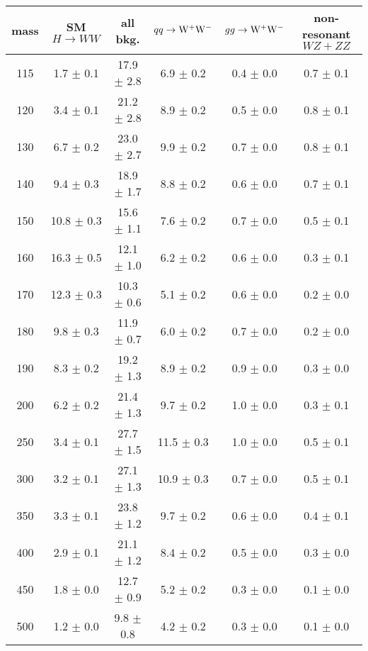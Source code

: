 \begin{table}[!ht]
  \begin{center}
 {\normalsize
  \begin{tabular} {|c|c|c|c|c|c|}
\hline
  mass    & SM $H\to WW$ & all bkg. & $qq \to \mathrm{W}^+\mathrm{W}^-$ & $gg \to \mathrm{W}^+\mathrm{W}^-$ & non-resonant $WZ+ZZ$ \\
  \hline
  \hline
115 &   1.7 $\pm$   0.1 &  17.9 $\pm$	 2.8  &   6.9 $\pm$	0.2 &	0.4 $\pm$   0.0 &   0.7 $\pm$	0.1 \\
120 &   3.4 $\pm$   0.1 &  21.2 $\pm$	 2.8  &   8.9 $\pm$	0.2 &	0.5 $\pm$   0.0 &   0.8 $\pm$	0.1 \\
130 &   6.7 $\pm$   0.2 &  23.0 $\pm$	 2.7  &   9.9 $\pm$	0.2 &	0.7 $\pm$   0.0 &   0.8 $\pm$	0.1 \\
140 &   9.4 $\pm$   0.3 &  18.9 $\pm$	 1.7  &   8.8 $\pm$	0.2 &	0.6 $\pm$   0.0 &   0.7 $\pm$	0.1 \\
150 &  10.8 $\pm$   0.3 &  15.6 $\pm$	 1.1  &   7.6 $\pm$	0.2 &	0.7 $\pm$   0.0 &   0.5 $\pm$	0.1 \\
160 &  16.3 $\pm$   0.5 &  12.1 $\pm$	 1.0  &   6.2 $\pm$	0.2 &	0.6 $\pm$   0.0 &   0.3 $\pm$	0.1 \\
170 &  12.3 $\pm$   0.3 &  10.3 $\pm$	 0.6  &   5.1 $\pm$	0.2 &	0.6 $\pm$   0.0 &   0.2 $\pm$	0.0 \\
180 &   9.8 $\pm$   0.3 &  11.9 $\pm$	 0.7  &   6.0 $\pm$	0.2 &	0.7 $\pm$   0.0 &   0.2 $\pm$	0.0 \\
190 &   8.3 $\pm$   0.2 &  19.2 $\pm$	 1.3  &   8.9 $\pm$	0.2 &	0.9 $\pm$   0.0 &   0.3 $\pm$	0.0 \\
200 &   6.2 $\pm$   0.2 &  21.4 $\pm$	 1.3  &   9.7 $\pm$	0.2 &	1.0 $\pm$   0.0 &   0.3 $\pm$	0.1 \\
250 &   3.4 $\pm$   0.1 &  27.7 $\pm$	 1.5  &  11.5 $\pm$	0.3 &	1.0 $\pm$   0.0 &   0.5 $\pm$	0.1 \\
300 &   3.2 $\pm$   0.1 &  27.1 $\pm$	 1.3  &  10.9 $\pm$	0.3 &	0.7 $\pm$   0.0 &   0.5 $\pm$	0.1 \\
350 &   3.3 $\pm$   0.1 &  23.8 $\pm$	 1.2  &   9.7 $\pm$	0.2 &	0.6 $\pm$   0.0 &   0.4 $\pm$	0.1 \\
400 &   2.9 $\pm$   0.1 &  21.1 $\pm$	 1.2  &   8.4 $\pm$	0.2 &	0.5 $\pm$   0.0 &   0.3 $\pm$	0.0 \\
450 &   1.8 $\pm$   0.0 &  12.7 $\pm$	 0.9  &   5.2 $\pm$	0.2 &	0.3 $\pm$   0.0 &   0.1 $\pm$	0.0 \\
500 &   1.2 $\pm$   0.0 &  9.8  $\pm$	 0.8  &   4.2 $\pm$	0.2 &	0.3 $\pm$   0.0 &   0.1 $\pm$	0.0 \\

\end{tabular}}
\end{center}
\end{table}
